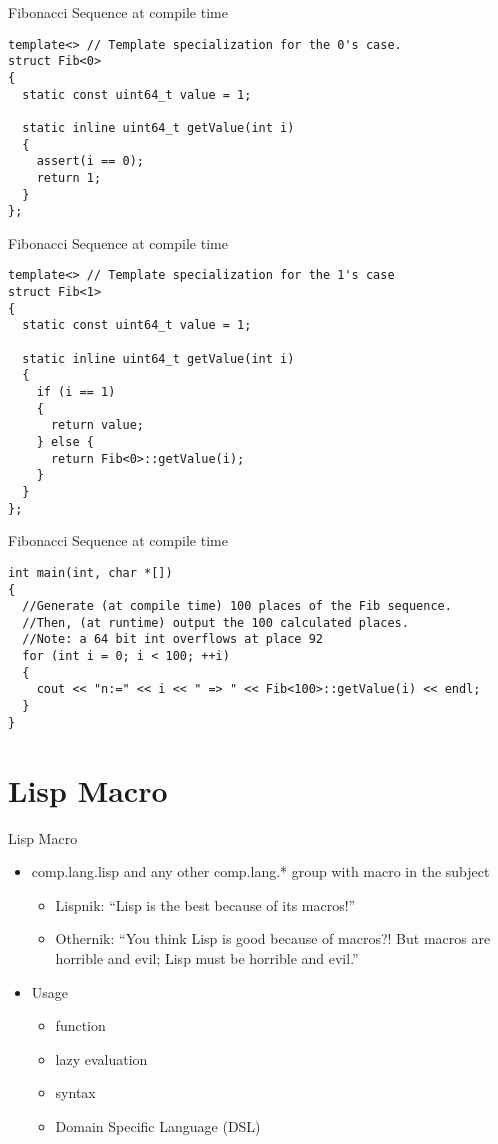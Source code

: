 \begin{frame}[containsverbatim]{Fibonacci Sequence at compile time}
\lstset{language=c++}
\begin{lstlisting}
template<> // Template specialization for the 0's case.
struct Fib<0>
{
  static const uint64_t value = 1;
 
  static inline uint64_t getValue(int i)
  {
    assert(i == 0);
    return 1;
  }
};
\end{lstlisting}
\end{frame}
 
\begin{frame}[containsverbatim]{Fibonacci Sequence at compile time}
\lstset{language=c++}
\begin{lstlisting}
template<> // Template specialization for the 1's case
struct Fib<1>
{
  static const uint64_t value = 1;
 
  static inline uint64_t getValue(int i)
  {
    if (i == 1)
    {
      return value;
    } else {
      return Fib<0>::getValue(i);
    }
  }
};
\end{lstlisting}
\end{frame}
 
\begin{frame}[containsverbatim]{Fibonacci Sequence at compile time}
\lstset{language=c++}
\begin{lstlisting}
int main(int, char *[])
{
  //Generate (at compile time) 100 places of the Fib sequence.
  //Then, (at runtime) output the 100 calculated places.
  //Note: a 64 bit int overflows at place 92
  for (int i = 0; i < 100; ++i)
  {
    cout << "n:=" << i << " => " << Fib<100>::getValue(i) << endl;
  }
}

\end{lstlisting}
\end{frame}

\section{Lisp Macro}
\begin{frame}{Lisp Macro}
\begin{itemize}
\item comp.lang.lisp and any other comp.lang.* group with macro in the subject
\begin{itemize}
\item Lispnik: “Lisp is the best because of its macros!”
\item Othernik: “You think Lisp is good because of macros?! But macros are horrible and evil; Lisp must be horrible and evil.”
\end{itemize}
\item Usage
\begin{itemize}
\item function
\item lazy evaluation
\item syntax
\item Domain Specific Language (DSL)
\end{itemize}
\end{itemize}
\end{frame}

